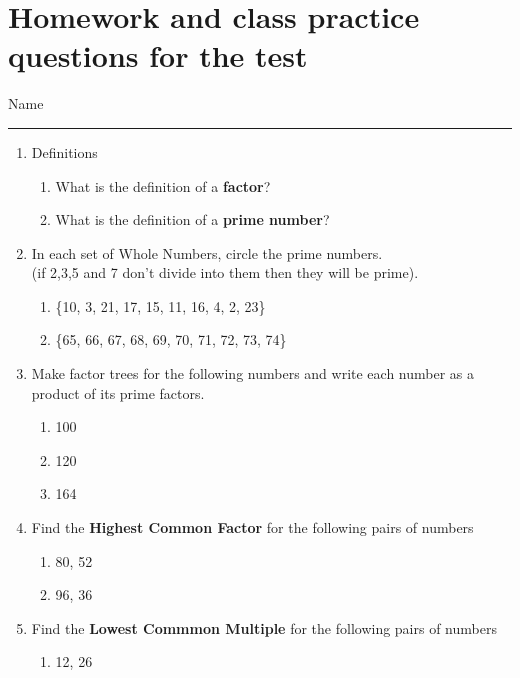 \documentclass[a4paper,12pt]{article}
\newcommand{\lThick}{0.1 mm}
\begin{document}
\section{Homework and class practice questions for the test}
\begin{flushright}
	Name\rule{8cm}{\lThick}
\end{flushright} 
\newcommand{\wdth}{2}
\newcommand{\hght}{1}
\begin{enumerate}
	\item Definitions
	\begin{enumerate}
		\item What is the definition of a \textbf{factor}?
		\item What is the definition of a \textbf{prime number}?
	\end{enumerate}
	\item In each set of Whole Numbers, circle the prime numbers.\\
	(if 2,3,5 and 7 don't divide into them then they will be prime).
	\begin{enumerate}
		\item \{10, 3, 21, 17, 15, 11, 16, 4, 2, 23\}
		\item \{65, 66, 67, 68, 69, 70, 71, 72, 73, 74\}
	\end{enumerate} 
	\item Make factor trees for the following numbers and write each number as a product of its prime factors.
	\begin{multicols}{4}
		\begin{enumerate}
			\item 100
			\item 120
			\item 164
		\end{enumerate}
	\end{multicols}
	\item Find the \textbf{Highest Common Factor} for the following pairs of numbers
\begin{multicols}{5}
	\begin{enumerate}
		\item 80, 52
		\item 96, 36
	\end{enumerate}
\end{multicols}
	\item Find the \textbf{Lowest Commmon Multiple} for the following pairs of numbers
	\begin{multicols}{5}
		\begin{enumerate}
			\item 12, 26

\end{enumerate}
\end{multicols}
\end{enumerate}
\end{document}
